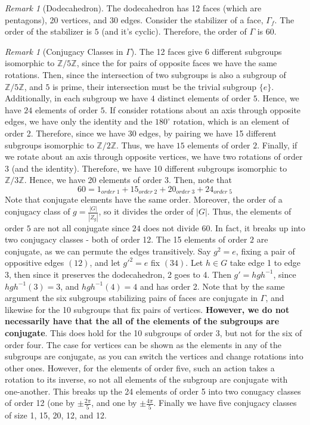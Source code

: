 \documentclass[12pt]{article}
\theoremstyle{definition}
\theoremstyle{remark}
\newtheorem{rmk}[thm]{Remark}
\numberwithin{equation}{section}
\newcommand\Z{\mathbb Z}    %
\newcommand\B[1]{\textbf{ #1}}
\begin{document}
\vspace{15pt}

\begin{rmk}[Dodecahedron]
        The dodecahedron has 12 faces (which are pentagons), 20 vertices, and 30 edges. Consider the stabilizer of a face, $\Gamma_f$. The order of the stabilizer is $5$ (and it's cyclic). Therefore, the order of $\Gamma$ is 60. 
\end{rmk}

\vspace{15pt}

\begin{rmk}[Conjugacy Classes in $\Gamma$]
        The 12 faces give 6 different subgroups isomorphic to $\Z/5\Z$, since the for pairs of opposite faces we have the same rotations. Then, since the intersection of two subgroups is also a subgroup of $\Z/5\Z$, and $5$ is prime, their intersection must be the trivial subgroup $\{e\}$. Additionally, in each subgroup we have $4$ distinct elements of order $5$. Hence, we have $24$ elements of order $5$. If consider rotations about an axis through opposite edges, we have only the identity and the $180^{\circ}$ rotation, which is an element of order 2. Therefore, since we have 30 edges, by pairing we have 15 different subgroups isomorphic to $\Z/2\Z$. Thus, we have $15$ elements of order $2$. Finally, if we rotate about an axis through opposite vertices, we have two rotations of order 3 (and the identity). Therefore, we have 10 different subgroups isomorphic to $\Z/3\Z$. Hence, we have 20 elements of order $3$. Then, note that \begin{equation}
                60 = 1_{order\;1} + 15_{order\;2} + 20_{order\;3} + 24_{order\;5}
        \end{equation}
        Note that conjugate elements have the same order. Moreover, the order of a conjugacy class of $g = \frac{|G|}{|Z_g|}$, so it divides the order of $|G|$. Thus, the elements of order $5$ are not all conjugate since $24$ does not divide $60$. In fact, it breaks up into two conjugacy classes - both of order 12. The 15 elements of order $2$ are conjugate, as we can permute the edges transitively. Say $g^2 = e$, fixing a pair of oppositive edges $(12)$, and let ${g'}^2 = e$ fix $(34)$. Let $h \in G$ take edge 1 to edge 3, then since it preserves the dodecahedron, 2 goes to 4. Then $g' = hgh^{-1}$, since $hgh^{-1}(3) = 3$, and $hgh^{-1}(4) = 4$ and has order 2. Note that by the same argument the six subgroups stabilizing pairs of faces are conjugate in $\Gamma$, and likewise for the 10 subgroups that fix pairs of vertices. \B{However, we do not necessarily have that the all of the elements of the subgroups are conjugate}. This does hold for the 10 subgroups of order 3, but not for the six of order four. The case for vertices can be shown as the elements in any of the subgroups are conjugate, as you can switch the vertices and change rotations into other ones. However, for the elements of order five, such an action takes a rotation to its inverse, so not all elements of the subgroup are conjugate with one-another. This breaks up the 24 elements of order 5 into two conugacy classes of order 12 (one by $\pm \frac{2\pi}{5}$, and one by $\pm \frac{4\pi}{5}$. Finally we have five conjugacy classes of size 1, 15, 20, 12, and 12.

\end{rmk}
\end{document}
